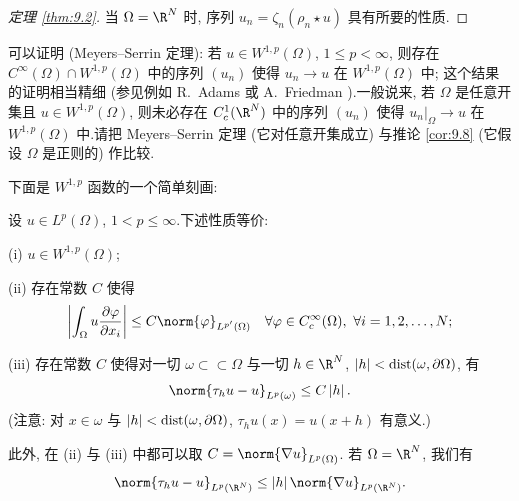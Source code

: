 \begin{proof}[定理 \ref{thm:9.2}]
当 $\Omega=\R^N$ 时, 序列 $u_n=\zeta_n(\rho_n\star u)$ 具有所要的性质.
\end{proof}

\begin{starremark}
\label{rem:9.5}
可以证明 (Meyers--Serrin 定理): 若 $u\in W^{1,p}(\Omega)$, $1\le p<\infty$,
则存在 $C^\infty(\Omega)\cap W^{1,p}(\Omega)$ 中的序列 $(u_n)$ 使得
$u_n\to u$ 在 $W^{1,p}(\Omega)$ 中; 这个结果的证明相当精细 (参见例如
R.~Adams  或 A.~Friedman ).一般说来,
若 $\Omega$ 是任意开集且 $u\in W^{1,p}(\Omega)$, 则未必存在
$C_c^1(\R^N)$ 中的序列 $(u_n)$ 使得 $u_n|_\Omega\to u$ 在 $W^{1,p}(\Omega)$
中.请把 Meyers--Serrin 定理 (它对任意开集成立) 与推论  \ref{cor:9.8}
(它假设 $\Omega$ 是正则的) 作比较.
\end{starremark}

下面是 $W^{1,p}$ 函数的一个简单刻画:

\begin{proposition}
\label{prop:9.3}
设 $u\in L^p(\Omega)$, $1<p\le\infty$.下述性质等价:

\noindent (i) $u\in W^{1,p}(\Omega)$;

\noindent (ii) 存在常数 $C$ 使得
\begin{equation*}
\left|\int_\Omega u\frac{\partial\varphi}{\partial x_i}\right|
\le C\norm{\varphi}_{L^{p'}(\Omega)}
\quad\forall\varphi\in C_c^\infty(\Omega),\
\forall i=1,2,\dots,N;
\end{equation*}

\noindent (iii) 存在常数 $C$ 使得对一切 $\omega\subset\subset\Omega$ 与一切
$h\in\R^N$, $\left|h\right|<\operatorname{dist}(\omega,\partial\Omega)$, 有
\begin{equation*}
\norm{\tau_hu-u}_{L^p(\omega)}\le C\abs{h}.
\end{equation*}
(注意: 对 $x\in\omega$ 与 $\left|h\right|<\operatorname{dist}(\omega,\partial\Omega)$,
$\tau_hu(x)=u(x+h)$ 有意义.)

此外, 在 (ii) 与 (iii) 中都可以取 $C=\norm{\nabla u}_{L^p(\Omega)}$.
若 $\Omega=\R^N$, 我们有
\begin{equation*}
\norm{\tau_hu-u}_{L^p(\R^N)}\le\abs{h}\norm{\nabla u}_{L^p(\R^N)}.
\end{equation*}
\end{proposition}

